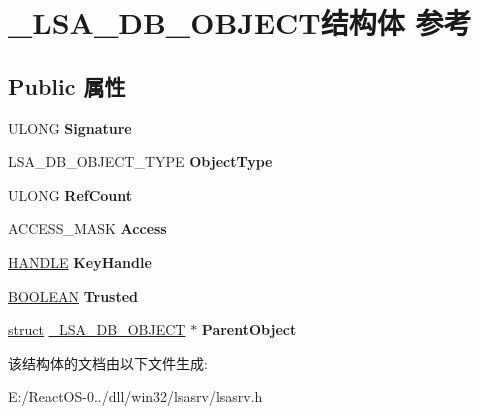 \hypertarget{struct___l_s_a___d_b___o_b_j_e_c_t}{}\section{\+\_\+\+L\+S\+A\+\_\+\+D\+B\+\_\+\+O\+B\+J\+E\+C\+T结构体 参考}
\label{struct___l_s_a___d_b___o_b_j_e_c_t}
\subsection*{Public 属性}
\begin{DoxyCompactItemize}
\item 
\mbox{\label{struct___l_s_a___d_b___o_b_j_e_c_t_aaeb630728ae32f0fc28b881d628439bc}} 
U\+L\+O\+NG {\bfseries Signature}
\item 
\mbox{\label{struct___l_s_a___d_b___o_b_j_e_c_t_ad0031dfda15bb6e0c4b5781488211866}} 
L\+S\+A\+\_\+\+D\+B\+\_\+\+O\+B\+J\+E\+C\+T\+\_\+\+T\+Y\+PE {\bfseries Object\+Type}
\item 
\mbox{\label{struct___l_s_a___d_b___o_b_j_e_c_t_a526d619a32aa265ac739a183afab919c}} 
U\+L\+O\+NG {\bfseries Ref\+Count}
\item 
\mbox{\label{struct___l_s_a___d_b___o_b_j_e_c_t_a07b9296f1717834960a2d2db379e9f6c}} 
A\+C\+C\+E\+S\+S\+\_\+\+M\+A\+SK {\bfseries Access}
\item 
\mbox{\label{struct___l_s_a___d_b___o_b_j_e_c_t_a0ba2a4a8b952762f5ffe5feffd90a3df}} 
\hyperlink{interfacevoid}{H\+A\+N\+D\+LE} {\bfseries Key\+Handle}
\item 
\mbox{\label{struct___l_s_a___d_b___o_b_j_e_c_t_a6f3968534146baeabe3d1f8ba88c9402}} 
\hyperlink{_processor_bind_8h_a112e3146cb38b6ee95e64d85842e380a}{B\+O\+O\+L\+E\+AN} {\bfseries Trusted}
\item 
\mbox{\label{struct___l_s_a___d_b___o_b_j_e_c_t_a6b4c46e541845aa57178ca5ba3a28f61}} 
\hyperlink{interfacestruct}{struct} \hyperlink{struct___l_s_a___d_b___o_b_j_e_c_t}{\+\_\+\+L\+S\+A\+\_\+\+D\+B\+\_\+\+O\+B\+J\+E\+CT} $\ast$ {\bfseries Parent\+Object}
\end{DoxyCompactItemize}


该结构体的文档由以下文件生成\+:\begin{DoxyCompactItemize}
\item 
E\+:/\+React\+O\+S-\/0../dll/win32/lsasrv/lsasrv.\+h\end{DoxyCompactItemize}

